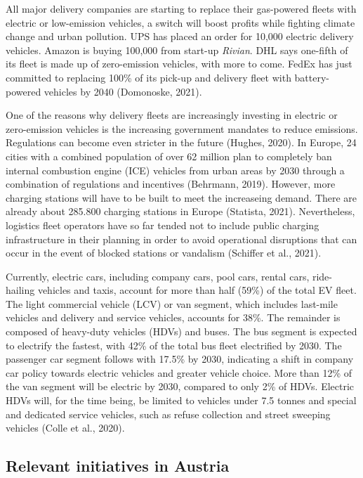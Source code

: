 \documentclass[
]{book}
\begin{document}
All major delivery companies are starting to replace their gas-powered fleets with electric or low-emission vehicles, a switch will boost profits while fighting climate change and urban pollution. UPS has placed an order for 10,000 electric delivery vehicles. Amazon is buying 100,000 from start-up \emph{Rivian}. DHL says one-fifth of its fleet is made up of zero-emission vehicles, with more to come. FedEx has just committed to replacing 100\% of its pick-up and delivery fleet with battery-powered vehicles by 2040 (Domonoske, 2021).

One of the reasons why delivery fleets are increasingly investing in electric or zero-emission vehicles is the increasing government mandates to reduce emissions. Regulations can become even stricter in the future (Hughes, 2020). In Europe, 24 cities with a combined population of over 62 million plan to completely ban internal combustion engine (ICE) vehicles from urban areas by 2030 through a combination of regulations and incentives (Behrmann, 2019). However, more charging stations will have to be built to meet the increaseing demand. There are already about 285.800 charging stations in Europe (Statista, 2021). Nevertheless, logistics fleet operators have so far tended not to include public charging infrastructure in their planning in order to avoid operational disruptions that can occur in the event of blocked stations or vandalism (Schiffer et al., 2021).

Currently, electric cars, including company cars, pool cars, rental cars, ride-hailing vehicles and taxis, account for more than half (59\%) of the total EV fleet. The light commercial vehicle (LCV) or van segment, which includes last-mile vehicles and delivery and service vehicles, accounts for 38\%. The remainder is composed of heavy-duty vehicles (HDVs) and buses. The bus segment is expected to electrify the fastest, with 42\% of the total bus fleet electrified by 2030. The passenger car segment follows with 17.5\% by 2030, indicating a shift in company car policy towards electric vehicles and greater vehicle choice. More than 12\% of the van segment will be electric by 2030, compared to only 2\% of HDVs. Electric HDVs will, for the time being, be limited to vehicles under 7.5 tonnes and special and dedicated service vehicles, such as refuse collection and street sweeping vehicles (Colle et al., 2020).

\hypertarget{relevant-initiatives-in-austria-34}{%
\subsection*{Relevant initiatives in Austria}\label{relevant-initiatives-in-austria-34}}
\end{document}
